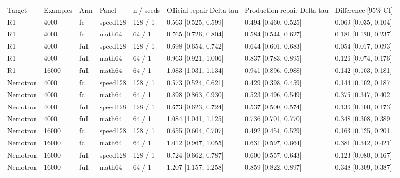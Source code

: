 \begin{tabular}{llllllll}
Target & Examples & Arm & Panel & n / seeds & Official repair Delta tau & Production repair Delta tau & Difference [95\% CI] \\
R1 & 4000 & fc & speed128 & 128 / 1 & 0.563 [0.525, 0.599] & 0.494 [0.460, 0.525] & 0.069 [0.035, 0.104] \\
R1 & 4000 & fc & math64 & 64 / 1 & 0.765 [0.726, 0.804] & 0.584 [0.544, 0.627] & 0.181 [0.120, 0.237] \\
R1 & 4000 & full & speed128 & 128 / 1 & 0.698 [0.654, 0.742] & 0.644 [0.601, 0.683] & 0.054 [0.017, 0.093] \\
R1 & 4000 & full & math64 & 64 / 1 & 0.963 [0.921, 1.006] & 0.837 [0.783, 0.895] & 0.126 [0.074, 0.176] \\
R1 & 16000 & full & math64 & 64 / 1 & 1.083 [1.031, 1.134] & 0.941 [0.896, 0.988] & 0.142 [0.103, 0.181] \\
Nemotron & 4000 & fc & speed128 & 128 / 1 & 0.573 [0.524, 0.621] & 0.429 [0.398, 0.459] & 0.144 [0.102, 0.187] \\
Nemotron & 4000 & fc & math64 & 64 / 1 & 0.898 [0.863, 0.930] & 0.523 [0.496, 0.549] & 0.375 [0.347, 0.402] \\
Nemotron & 4000 & full & speed128 & 128 / 1 & 0.673 [0.623, 0.724] & 0.537 [0.500, 0.574] & 0.136 [0.100, 0.173] \\
Nemotron & 4000 & full & math64 & 64 / 1 & 1.084 [1.041, 1.125] & 0.736 [0.701, 0.770] & 0.348 [0.308, 0.389] \\
Nemotron & 16000 & fc & speed128 & 128 / 1 & 0.655 [0.604, 0.707] & 0.492 [0.454, 0.529] & 0.163 [0.125, 0.201] \\
Nemotron & 16000 & fc & math64 & 64 / 1 & 1.012 [0.967, 1.055] & 0.631 [0.597, 0.664] & 0.381 [0.342, 0.421] \\
Nemotron & 16000 & full & speed128 & 128 / 1 & 0.724 [0.662, 0.787] & 0.600 [0.557, 0.643] & 0.123 [0.080, 0.167] \\
Nemotron & 16000 & full & math64 & 64 / 1 & 1.207 [1.157, 1.258] & 0.859 [0.822, 0.897] & 0.348 [0.309, 0.387] \\
\end{tabular}
